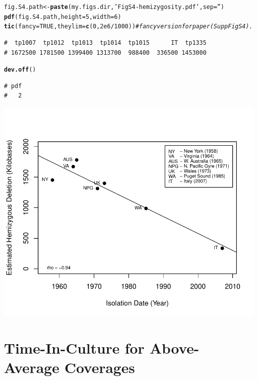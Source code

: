 \documentclass{article}\usepackage[]{graphicx}\usepackage[]{color}
\makeatletter
\newcommand{\hlnum}[1]{\textcolor[rgb]{0.686,0.059,0.569}{#1}}%
\newcommand{\hlstr}[1]{\textcolor[rgb]{0.192,0.494,0.8}{#1}}%
\newcommand{\hlcom}[1]{\textcolor[rgb]{0.678,0.584,0.686}{\textit{#1}}}%
\newcommand{\hlopt}[1]{\textcolor[rgb]{0,0,0}{#1}}%
\newcommand{\hlstd}[1]{\textcolor[rgb]{0.345,0.345,0.345}{#1}}%
\newcommand{\hlkwb}[1]{\textcolor[rgb]{0.69,0.353,0.396}{#1}}%
\newcommand{\hlkwc}[1]{\textcolor[rgb]{0.333,0.667,0.333}{#1}}%
\newcommand{\hlkwd}[1]{\textcolor[rgb]{0.737,0.353,0.396}{\textbf{#1}}}%
\newenvironment{kframe}{%
 \def\at@end@of@kframe{}%
 \ifinner\ifhmode%
  \def\at@end@of@kframe{\end{minipage}}%
  \begin{minipage}{\columnwidth}%
 \fi\fi%
 \def\FrameCommand##1{\hskip\@totalleftmargin \hskip-\fboxsep
 \colorbox{shadecolor}{##1}\hskip-\fboxsep
     \hskip-\linewidth \hskip-\@totalleftmargin \hskip\columnwidth}%
 \MakeFramed {\advance\hsize-\width
   \@totalleftmargin\z@ \linewidth\hsize
   \@setminipage}}%
 {\par\unskip\endMakeFramed%
 \at@end@of@kframe}
\newenvironment{knitrout}{}{} %
\makeatother
\begin{document}
\begin{knitrout}\footnotesize
{}\color{fgcolor}\begin{kframe}
\begin{alltt}
\hlstd{fig.S4.path} \hlkwb{<-} \hlkwd{paste}\hlstd{(my.figs.dir,} \hlstr{'FigS4-hemizygosity.pdf'}\hlstd{,} \hlkwc{sep}\hlstd{=}\hlstr{''}\hlstd{)}
\hlkwd{pdf}\hlstd{(fig.S4.path,}\hlkwc{height}\hlstd{=}\hlnum{5}\hlstd{,}\hlkwc{width}\hlstd{=}\hlnum{6}\hlstd{)}
\hlkwd{tic}\hlstd{(}\hlkwc{fancy}\hlstd{=}\hlnum{TRUE}\hlstd{,}\hlkwc{theylim}\hlstd{=}\hlkwd{c}\hlstd{(}\hlnum{0}\hlstd{,}\hlnum{2e6}\hlopt{/}\hlnum{1000}\hlstd{))} \hlcom{# fancy version for paper (Supp Fig S4).}
\end{alltt}
\begin{verbatim}
#  tp1007  tp1012  tp1013  tp1014  tp1015      IT  tp1335 
# 1672500 1781500 1399400 1313700  988400  336500 1453000
\end{verbatim}
\begin{alltt}
\hlkwd{dev.off}\hlstd{()}
\end{alltt}
\begin{verbatim}
# pdf 
#   2
\end{verbatim}
\end{kframe}
\end{knitrout}
\includegraphics{figs-mine/FigS4-hemizygosity.pdf}

\section{Time-In-Culture for Above-Average Coverages}
\end{document}
